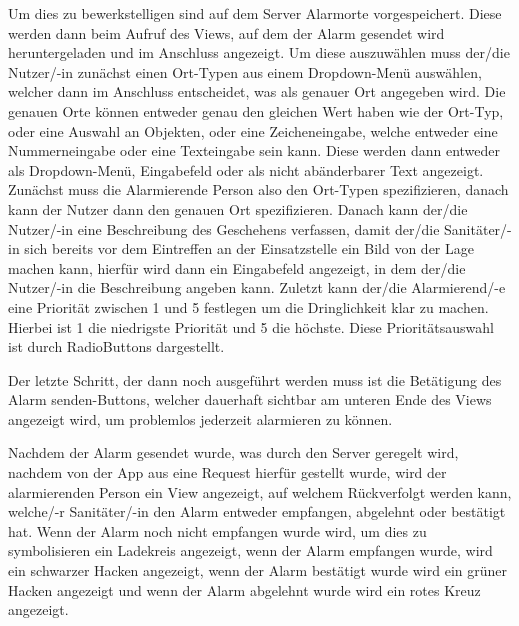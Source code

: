      Um dies zu bewerkstelligen sind auf dem Server Alarmorte vorgespeichert.
     Diese werden dann beim Aufruf des Views, auf dem der Alarm gesendet wird 
     heruntergeladen und im Anschluss angezeigt. Um diese auszuwählen muss der/die 
     Nutzer/-in zunächst einen Ort-Typen aus einem Dropdown-Menü auswählen, welcher
     dann im Anschluss entscheidet, was als genauer Ort angegeben wird. Die genauen 
     Orte können entweder genau den gleichen Wert haben wie der Ort-Typ, oder eine 
     Auswahl an Objekten, oder eine Zeicheneingabe, welche entweder eine 
     Nummerneingabe oder eine Texteingabe sein kann. Diese werden dann entweder als 
     Dropdown-Menü, Eingabefeld oder als nicht abänderbarer Text angezeigt.
     Zunächst muss die Alarmierende Person also den Ort-Typen spezifizieren, danach 
     kann der Nutzer dann den genauen Ort spezifizieren. Danach kann der/die 
     Nutzer/-in eine Beschreibung des Geschehens verfassen, damit der/die 
     Sanitäter/-in sich bereits vor dem Eintreffen an der Einsatzstelle ein Bild von 
     der Lage machen kann, hierfür wird dann ein Eingabefeld angezeigt, in dem 
     der/die Nutzer/-in die Beschreibung angeben kann. Zuletzt kann der/die 
     Alarmierend/-e eine Priorität zwischen 1 und 5 festlegen um die Dringlichkeit 
     klar zu machen. Hierbei ist 1 die niedrigste Priorität und 5 die höchste. Diese 
     Prioritätsauswahl ist durch RadioButtons dargestellt.

    Der letzte Schritt, der dann noch ausgeführt werden muss ist die 
    Betätigung des \glqq Alarm senden\grqq-Buttons, welcher dauerhaft sichtbar am 
    unteren Ende des Views angezeigt wird, um problemlos jederzeit alarmieren zu 
    können.

    Nachdem der Alarm gesendet wurde, was durch den Server geregelt wird, 
    nachdem von der App aus eine Request hierfür gestellt wurde, wird der 
    alarmierenden Person ein View angezeigt, auf welchem Rückverfolgt werden kann, 
    welche/-r Sanitäter/-in den Alarm entweder empfangen, abgelehnt oder bestätigt hat.
    Wenn der Alarm noch nicht empfangen wurde wird, um dies zu symbolisieren ein 
    Ladekreis angezeigt, wenn der Alarm empfangen wurde, wird ein schwarzer Hacken
    angezeigt, wenn der Alarm bestätigt wurde wird ein grüner Hacken angezeigt und 
    wenn der Alarm abgelehnt wurde wird ein rotes Kreuz angezeigt.

